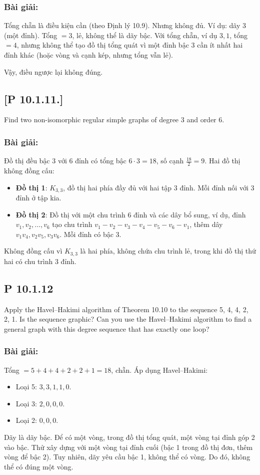 \documentclass[a4paper,12pt]{article}
\begin{document}
\subsubsection*{Bài giải:}
Tổng chẵn là điều kiện cần (theo Định lý 10.9). Nhưng không đủ. Ví dụ: dãy \( 3 \) (một đỉnh). Tổng \( = 3 \), lẻ, không thể là dãy bậc. Với tổng chẵn, ví dụ \( 3, 1 \), tổng \( = 4 \), nhưng không thể tạo đồ thị tổng quát vì một đỉnh bậc 3 cần ít nhất hai đỉnh khác (hoặc vòng và cạnh kép, nhưng tổng vẫn lẻ).

Vậy, điều ngược lại không đúng.

\subsection*{[P 10.1.11.]} Find two non-isomorphic regular simple graphs of degree 3 and order 6.

\subsubsection*{Bài giải:}
Đồ thị đều bậc 3 với 6 đỉnh có tổng bậc \( 6 \cdot 3 = 18 \), số cạnh \( \frac{18}{2} = 9 \). Hai đồ thị không đồng cấu:
\begin{itemize}
    \item \textbf{Đồ thị 1}: \( K_{3,3} \), đồ thị hai phía đầy đủ với hai tập 3 đỉnh. Mỗi đỉnh nối với 3 đỉnh ở tập kia.
    \item \textbf{Đồ thị 2}: Đồ thị với một chu trình 6 đỉnh và các dây bổ sung, ví dụ, đỉnh \( v_1, v_2, \ldots, v_6 \) tạo chu trình \( v_1-v_2-v_3-v_4-v_5-v_6-v_1 \), thêm dây \( v_1v_4, v_2v_5, v_3v_6 \). Mỗi đỉnh có bậc 3.
\end{itemize}
Không đồng cấu vì \( K_{3,3} \) là hai phía, không chứa chu trình lẻ, trong khi đồ thị thứ hai có chu trình 3 đỉnh.

\subsection*{P 10.1.12}
Apply the Havel–Hakimi algorithm of Theorem 10.10 to the sequence 5, 4, 4, 2, 2, 1. Is the sequence graphic? Can you use the Havel–Hakimi algorithm to find a general graph with this degree sequence that has exactly one loop?

\subsubsection*{Bài giải:}
Tổng \( = 5 + 4 + 4 + 2 + 2 + 1 = 18 \), chẵn. Áp dụng Havel–Hakimi:
\begin{itemize}
    \item Loại 5: \( 3, 3, 1, 1, 0 \).
    \item Loại 3: \( 2, 0, 0, 0 \).
    \item Loại 2: \( 0, 0, 0 \).
\end{itemize}
Dãy là dãy bậc. Để có một vòng, trong đồ thị tổng quát, một vòng tại đỉnh góp 2 vào bậc. Thử xây dựng với một vòng tại đỉnh cuối (bậc 1 trong đồ thị đơn, thêm vòng để bậc 2). Tuy nhiên, dãy yêu cầu bậc 1, không thể có vòng. Do đó, không thể có đúng một vòng.
\end{document}
